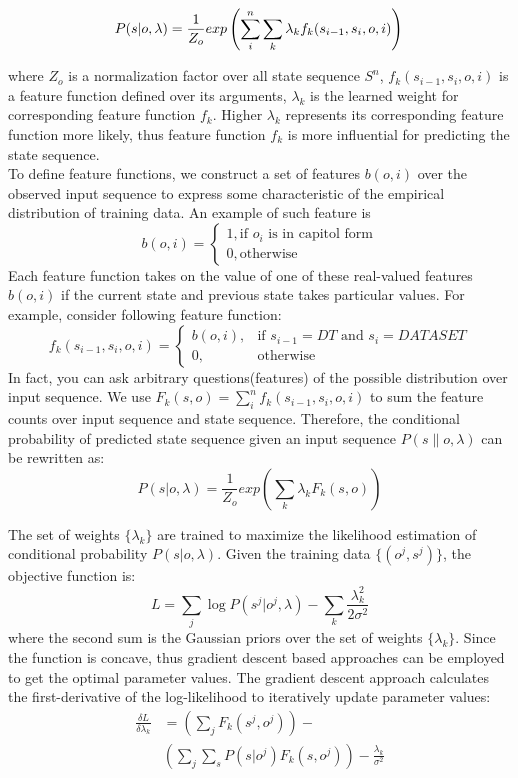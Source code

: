 \documentclass[11pt]{article}
\begin{document}
\[
P(s | o,\lambda) = \frac{1}{Z_o} exp \left( \sum_{i}^n \sum_{k} \lambda_{k} f_{k}(s_{i-1}, s_{i}, o, i) \right)  \\
\]

where $Z_o$ is a normalization factor over all state sequence $S^n$, $f_{k}(s_{i-1}, s_{i}, o, i)$ is a feature function defined over its arguments, $\lambda_{k}$ is the learned weight for corresponding feature function $f_k$. Higher $\lambda_{k}$ represents its corresponding feature function more likely, thus feature function $f_k$ is more influential for predicting the state sequence. \\

To define feature functions, we construct a set of features $b(o, i)$ over the observed input sequence to express some characteristic of the empirical distribution of training data. An example of such feature is\\
\[
	b(o, i) = 
	\begin{cases}
		1, \text{if $o_i$ is in capitol form} \\
		0, \text{otherwise}
	\end{cases}
\]
Each feature function takes on the value of one of these real-valued features $b(o, i)$ if the current state and previous state takes particular values. For example, consider following feature function:
\[
	f_k(s_{i-1}, s_i, o, i) = 
	\begin{cases}
		b(o, i), &\text{if $s_{i-1} = DT$ and $s_{i} = DATASET$} \\
		0,	   &\text{otherwise}
	\end{cases}
\]
In fact, you can ask arbitrary questions(features) of the possible distribution over input sequence. We use $F_k(s, o) = \sum_{i}^n f_{k}(s_{i-1}, s_{i}, o, i)$ to sum the feature counts over input sequence and state sequence. Therefore, the conditional probability of predicted state sequence given an input sequence $P(s \| o, \lambda)$ can be rewritten as:
\[
	P(s | o, \lambda) = \frac{1}{Z_o} exp \left( \sum_{k} \lambda_{k} F_k(s, o) \right)
\]

The set of weights $\{ \lambda_k \}$ are trained to maximize the likelihood estimation of conditional probability $P(s | o, \lambda)$. Given the training data $\{(o^j, s^j)\}$, the objective function is:
\[
	L = \sum_{j} \log P(s^j | o^j, \lambda) -\sum_k \frac{\lambda_k^2}{2 \sigma^2} 
\]
where the second sum is the Gaussian priors over the set of weights $\{ \lambda_k \}$. Since the function is concave, thus gradient descent based approaches can be employed to get the optimal parameter values. The gradient descent approach calculates the first-derivative of the log-likelihood to iteratively update parameter values:
\begin{align*}
	\frac{\delta L}{\delta \lambda_k} & = \left( \sum_j F_k(s^j, o^j) \right) - \\
							& \left( \sum_j \sum_s P(s|o^j) F_k(s, o^j)\right) - \frac{\lambda_k}{\sigma^2} 
\end{align*}
\end{document}
